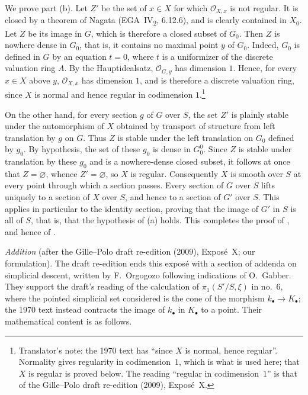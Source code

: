 We prove part (b). Let \(Z'\) be the set of \(x\in X\) for which
\(\mathcal O_{X,x}\) is not regular. It is closed by a theorem of Nagata
(EGA~IV\textsubscript{2}, 6.12.6), and is clearly contained in \(X_0\).
Let \(Z\) be its image in \(G\), which is therefore a closed subset of
\(G_0\). Then \(Z\) is nowhere dense in \(G_0\), that is, it contains no
maximal point \(y\) of \(G_0\). Indeed, \(G_0\) is defined in \(G\) by an
equation \(t=0\), where \(t\) is a uniformizer of the discrete valuation
ring \(A\). By the Hauptidealsatz, \(\mathcal O_{G,y}\) has dimension
\(1\). Hence, for every \(x\in X\) above \(y\),
\(\mathcal O_{X,x}\) has dimension \(1\), and is therefore a discrete
valuation ring, since \(X\) is normal and hence regular in codimension
\(1\).\footnote{Translator's note: the 1970 text has ``since \(X\) is
normal, hence regular''. Normality gives regularity in codimension~\(1\),
which is what is used here; that \(X\) is regular is proved below. The
reading ``regular in codimension~\(1\)'' is that of the Gille--Polo draft re-edition (2009), Exposé~X.}

On the other hand, for every section \(g\) of \(G\) over \(S\), the set
\(Z'\) is plainly stable under the automorphism of \(X\) obtained by
transport of structure from left translation by \(g\) on \(G\). Thus
\(Z\) is stable under the left translation on \(G_0\) defined by \(g_0\).
By hypothesis, the set of these \(g_0\) is dense in \(G_0^0\). Since
\(Z\) is stable under translation by these \(g_0\) and is a nowhere-dense
closed subset, it follows at once that \(Z=\varnothing\), whence
\(Z'=\varnothing\), so \(X\) is regular. Consequently \(X\) is smooth
over \(S\) at every point through which a section passes. Every section
of \(G\) over \(S\) lifts uniquely to a section of \(X\) over \(S\), and
hence to a section of \(G'\) over \(S\). This applies in particular to the
identity section, proving that the image of \(G'\) in \(S\) is all of
\(S\), that is, that the hypothesis of (a) holds. This completes the
proof of , and hence of .

\par\medskip\noindent{}\emph{Addition}
(after the Gille--Polo draft re-edition (2009), Exposé~X; our formulation). The draft re-edition ends this
exposé with a section of addenda on simplicial descent, written by
F.~Orgogozo following indications of O.~Gabber. They support the draft's
reading of the calculation of \(\pi_1(S'/S,\xi)\) in no.~6, where the
pointed simplicial set considered is the cone of the morphism
\(k_\bullet\to K_\bullet\); the 1970 text instead contracts the image of
\(k_\bullet\) in \(K_\bullet\) to a point. Their mathematical content is as
follows.

